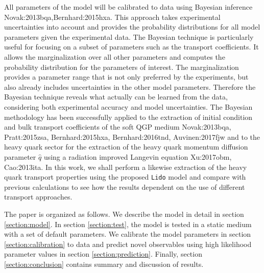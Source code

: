 All parameters of the model will be calibrated to data using Bayesian inference {Novak:2013bqa,Bernhard:2015hxa}.
This approach takes experimental uncertainties into account and provides the probability distributions for all model parameters given the experimental data.
The Bayesian technique is particularly useful for focusing on a subset of parameters such as the transport coefficients.
It allows the marginalization over all other parameters and computes the probability distribution for the parameters of interest. 
The marginalization provides a parameter range that is not only preferred by the experiments, but also already includes uncertainties in the other model parameters.
Therefore the Bayesian technique reveals what actually can be learned from the data, considering both experimental accuracy and model uncertainties.
The Bayesian methodology has been successfully applied to the extraction of initial condition and bulk transport coefficients of the soft QGP medium {Novak:2013bqa, Pratt:2015zsa, Bernhard:2015hxa, Bernhard:2016tnd, Auvinen:2017fjw} and to the heavy quark sector for the extraction of the heavy quark momentum diffusion parameter $\hat{q}$ using a radiation improved Langevin equation {Xu:2017obm, Cao:2013ita}.
In this work, we shall perform a likewise extraction of the heavy quark transport properties using the proposed {\tt Lido} model and compare with previous calculations to see how the results dependent on the use of different transport approaches.

The paper is organized as follows. 
We describe the model in detail in section \ref{section:model}. In section \ref{section:test}, the model is tested in a static medium with a set of default parameters. 
We calibrate the model parameters in section \ref{section:calibration} to data and predict novel observables using high likelihood parameter values in section \ref{section:prediction}. 
Finally, section \ref{section:conclusion} contains summary and discussion of results.

